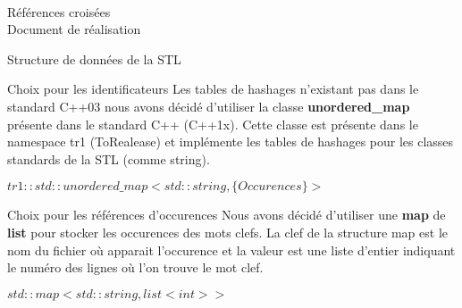 \documentclass{article}
\begin{document}
\fancyfoot[]{}
\begin{center}
\Huge{\ \\[6em]Références croisées \\ Document de réalisation}
\end{center}

\newpage

\fancyfoot[]{}
\setcounter{tocdepth}{4}
\tableofcontents

\newpage

\fancyfoot[C]{\thepage}

\begin{section}{Structure de données de la STL}

  \begin{subsection}{Choix pour les identificateurs}
  Les tables de hashages n'existant pas dans le standard C++03 nous avons décidé d'utiliser la classe \textbf{unordered\_map} présente 
  dans le standard C++ (C++1x). Cette classe est présente dans le namespace tr1 (ToRealease) et implémente les tables de hashages
  pour les classes standards de la STL (comme string).

  \begin{center}
	\textbf{$tr1::std::unordered\_map<std::string, \{Occurences\}>$}
      \end{center}
  \end{subsection}

  \begin{subsection}{Choix pour les références d'occurences}
  Nous avons décidé d'utiliser une \textbf{map} de \textbf{list} pour stocker les occurences des mots clefs.
  La clef de la structure map est le nom du fichier où apparait l'occurence et la valeur est une liste d'entier indiquant
  le numéro des lignes où l'on trouve le mot clef.

  \begin{center}
	\textbf{$std::map<std::string, list<int>>$}
      \end{center}
  \end{subsection}

\end{section}
\end{document}
